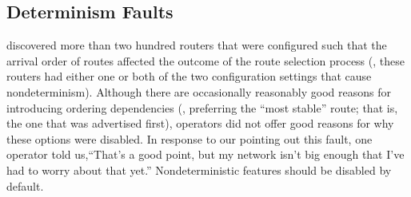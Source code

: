 \subsection{Determinism Faults}

\rcc discovered more than two hundred routers that were
configured such that the arrival order of routes affected the outcome of
the route selection process (\ie, these routers had either one or both of
the two configuration settings that cause nondeterminism).  Although
there are occasionally reasonably good reasons for introducing ordering
dependencies (\eg, preferring the ``most stable'' route; that is, the
one that was advertised first), operators did not offer good reasons for
why these options were disabled.  In response to our pointing out this
fault, one operator told us,``That's a good point, but my network isn't
big enough that I've had to worry about that yet.''  
Nondeterministic features should be disabled by default.







